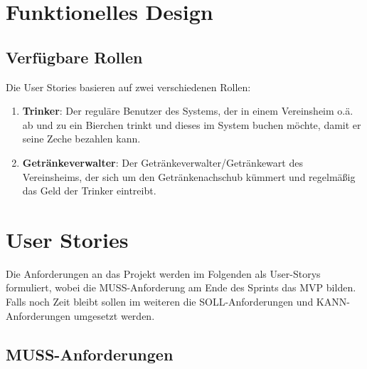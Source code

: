 \documentclass[conference,a4paper]{cs-techrep}
\begin{document}
\section{Funktionelles Design}
\subsection{Verfügbare Rollen}
Die User Stories basieren auf zwei verschiedenen Rollen:
\begin{enumerate}
\item \textbf{Trinker}: 
Der reguläre Benutzer des Systems, der in einem Vereinsheim o.ä. ab und zu ein Bierchen trinkt und dieses im System buchen möchte, damit er seine Zeche bezahlen kann.
\item \textbf{Getränkeverwalter}: 
Der Getränkeverwalter/Getränkewart des Vereinsheims, der sich um den Getränkenachschub kümmert und regelmäßig das Geld der Trinker eintreibt.
\end{enumerate}

\section{User Stories}

Die Anforderungen an das Projekt werden im Folgenden als User-Storys formuliert, wobei die MUSS-Anforderung am Ende des Sprints das MVP bilden. Falls noch Zeit bleibt sollen im weiteren die SOLL-Anforderungen und KANN-Anforderungen umgesetzt werden.

\subsection{MUSS-Anforderungen}
\end{document}
